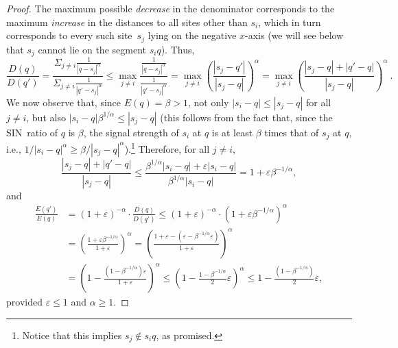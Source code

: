 \documentclass[11pt]{article}
\theoremstyle{remark}
\let\eps\varepsilon
\begin{document}
\begin{proof}
  The maximum possible \emph{decrease} in the denominator
  corresponds to the maximum \emph{increase} in the distances to all
  sites other than $s_i$, which in turn corresponds to every such
  site~$s_j$ lying on the negative $x$-axis (we will see below that $s_j$
  cannot lie on the segment $s_iq$).  Thus,
  \[
     \frac{D(q)}{D(q')} = \frac{\Sigma_{j \ne i}{\frac{1}{|q-s_j|^\alpha}}}{\Sigma_{j \ne i}{\frac{1}{|q'-s_j|^\alpha}}} \le
     \max_{j \ne i}\frac{\frac{1}{|q-s_j|^\alpha}}{\frac{1}{|q'-s_j|^\alpha}} = \max_{j \ne i}(\frac{|s_j-q'|}{|s_j-q|})^\alpha =
     \max_{j \ne i}(\frac{|s_j-q|+|q'-q|}{|s_j-q|})^\alpha \ .
  \]
  We now observe that, since $E(q)=\beta>1$, not only
  $|s_i-q| \leq |s_j-q|$ for all $j\neq i$, but also
  $|s_i-q| \beta^{1/\alpha} \leq |s_j-q|$ (this follows from the fact that, since the SIN~ratio of $q$ is $\beta$, the signal strength of $s_i$ at $q$ is at least $\beta$ times that of $s_j$ at $q$, i.e., $1/|s_i-q|^\alpha \geq \beta/|s_j-q|^\alpha$).\footnote{
    Notice that this implies $s_j \not\in s_iq$, as promised.}
  Therefore, for all $j\neq i$,
  \[
    \frac{|s_j-q|+|q'-q|}{|s_j-q|} \leq \frac{\beta^{1/\alpha} |s_i-q|+\eps|s_i-q|}{\beta^{1/\alpha}
      |s_i-q|} =
{1+\eps\beta^{-1/\alpha}},
  \]
  and
  \begin{align*}
    \frac{E(q')}{E(q)} & = (1+\eps)^{-\alpha} \cdot \frac{D(q)}{D(q')} \le
    (1+\eps)^{-\alpha} \cdot (1+\eps\beta^{-1/\alpha})^\alpha \\
    & = (\frac{1+\eps\beta^{-1/\alpha}}{1+\eps})^\alpha 
    = (\frac{1+\eps - (\eps-\beta^{-1/\alpha}\eps)} {1+\eps})^\alpha\\
    &
      = (1 -  \frac { (1  - \beta^{-1/\alpha})\eps } { 1 + \eps})^\alpha
      \le  (1 -  \frac { 1  - \beta^{-1/\alpha } }{ 2}  \eps)^\alpha
      \leq 1-\frac{(1-\beta^{-1/\alpha})}{2}\eps,
  \end{align*}
  provided $\eps \leq 1$ and $\alpha\geq 1$.
   

\end{proof}
\end{document}

